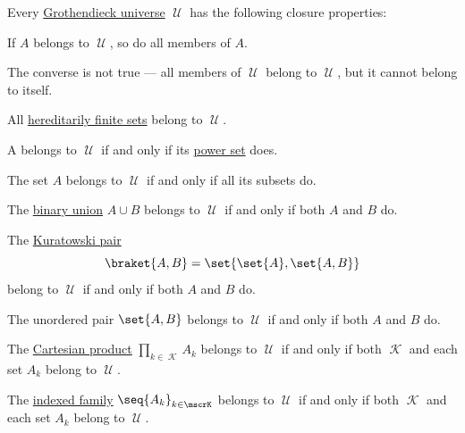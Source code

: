 \begin{proposition}\label{thm:grothendieck_universe_closure}
  Every \hyperref[def:grothendieck_universe]{Grothendieck universe} \( \mscrU \) has the following closure properties:
  \begin{thmenum}
     If \( A \) belongs to \( \mscrU \), so do all members of \( A \).

    The converse is not true --- all members of \( \mscrU \) belong to \( \mscrU \), but it cannot belong to itself.

     All \hyperref[def:universe_of_hereditary_finite_sets]{hereditarily finite sets} belong to \( \mscrU \).

     A belongs to \( \mscrU \) if and only if its \hyperref[def:power_set]{power set} does.

     The set \( A \) belongs to \( \mscrU \) if and only if all its subsets do.

     The \hyperref[def:set_union]{binary union} \( A \cup B \) belongs to \( \mscrU \) if and only if both \( A \) and \( B \) do.

     The \hyperref[def:kuratowski_pair]{Kuratowski pair}
    \begin{equation*}
      \braket{ A, B } = \set{ \set{ A }, \set{ A, B } }
    \end{equation*}
    belong to \( \mscrU \) if and only if both \( A \) and \( B \) do.

     The unordered pair \( \set{ A, B } \) belongs to \( \mscrU \) if and only if both \( A \) and \( B \) do.

     The \hyperref[def:cartesian_product]{Cartesian product} \( \prod_{k \in \mscrK} A_k \) belongs to \( \mscrU \) if and only if both \( \mscrK \) and each set \( A_k \) belong to \( \mscrU \).

     The \hyperref[def:indexed_family]{indexed family} \( \seq{ A_k }_{k \in \mscrK} \) belongs to \( \mscrU \) if and only if both \( \mscrK \) and each set \( A_k \) belong to \( \mscrU \).


\end{thmenum}
\end{proposition}
